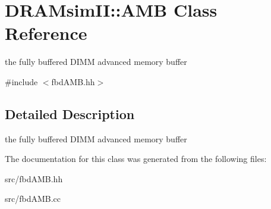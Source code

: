 \section{DRAMsimII::AMB Class Reference}
\label{class_d_r_a_msim_i_i_1_1_a_m_b}


the fully buffered DIMM advanced memory buffer  




{\ttfamily \#include $<$fbdAMB.hh$>$}



\subsection{Detailed Description}
the fully buffered DIMM advanced memory buffer 

The documentation for this class was generated from the following files:\begin{DoxyCompactItemize}
\item 
src/fbdAMB.hh\item 
src/fbdAMB.cc\end{DoxyCompactItemize}
